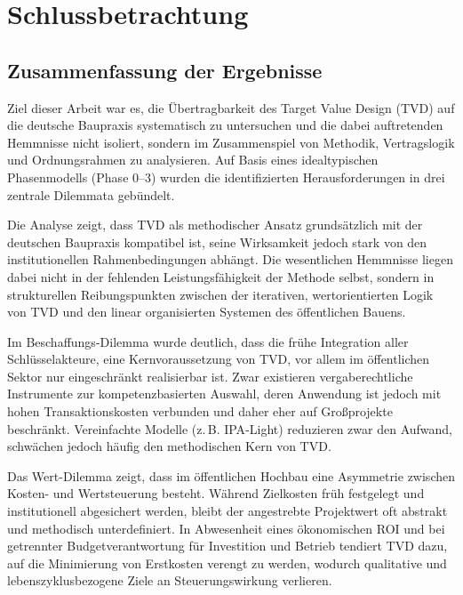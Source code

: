 \chapter{Schlussbetrachtung}
\label{ch:6}

\section{Zusammenfassung der Ergebnisse}
\label{sec:6.1}

Ziel dieser Arbeit war es, die Übertragbarkeit des Target Value Design (\acs{TVD}) auf die deutsche Baupraxis systematisch zu untersuchen und die dabei auftretenden Hemmnisse nicht isoliert, sondern im Zusammenspiel von Methodik, Vertragslogik und Ordnungsrahmen zu analysieren. Auf Basis eines idealtypischen Phasenmodells (Phase 0–3) wurden die identifizierten Herausforderungen in drei zentrale Dilemmata gebündelt.

Die Analyse zeigt, dass \acs{TVD} als methodischer Ansatz grundsätzlich mit der deutschen Baupraxis kompatibel ist, seine Wirksamkeit jedoch stark von den institutionellen Rahmenbedingungen abhängt. Die wesentlichen Hemmnisse liegen dabei nicht in der fehlenden Leistungsfähigkeit der Methode selbst, sondern in strukturellen Reibungspunkten zwischen der iterativen, wertorientierten Logik von \acs{TVD} und den linear organisierten Systemen des öffentlichen Bauens.

Im Beschaffungs-Dilemma wurde deutlich, dass die frühe Integration aller Schlüsselakteure, eine Kernvoraussetzung von \acs{TVD}, vor allem im öffentlichen Sektor nur eingeschränkt realisierbar ist. Zwar existieren vergaberechtliche Instrumente zur kompetenzbasierten Auswahl, deren Anwendung ist jedoch mit hohen Transaktionskosten verbunden und daher eher auf Großprojekte beschränkt. Vereinfachte Modelle (z.\,B. \acs{IPA}-Light) reduzieren zwar den Aufwand, schwächen jedoch häufig den methodischen Kern von \acs{TVD}.

Das Wert-Dilemma zeigt, dass im öffentlichen Hochbau eine Asymmetrie zwischen Kosten- und Wertsteuerung besteht. Während Zielkosten früh festgelegt und institutionell abgesichert werden, bleibt der angestrebte Projektwert oft abstrakt und methodisch unterdefiniert. In Abwesenheit eines ökonomischen \acs{ROI} und bei getrennter Budgetverantwortung für Investition und Betrieb tendiert \acs{TVD} dazu, auf die Minimierung von Erstkosten verengt zu werden, wodurch qualitative und lebenszyklusbezogene Ziele an Steuerungswirkung verlieren.

